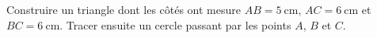 
\begin{exercice}\label{exosmath-0914}

    Construire un triangle dont les côtés ont mesure $AB=\SI{5}{\centi\meter}$, \( AC=\SI{6}{\centi\meter}\) et \( BC=\SI{6}{\centi\meter}\). Tracer ensuite un cercle passant par les points \( A\), \( B\) et \( C\).

\end{exercice}
